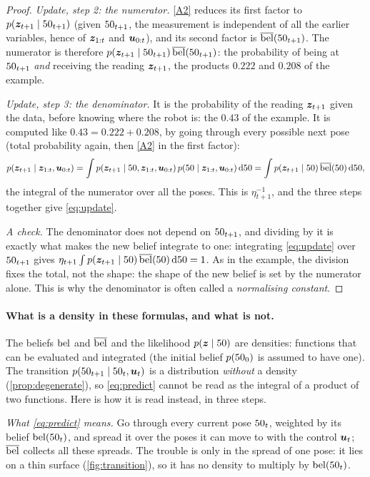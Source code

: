 \begin{proof}
\emph{Update, step 2: the numerator.} \ref{A2} reduces its first factor
to $p(\bm{z}_{t+1}\mid50_{t+1})$ (given $50_{t+1}$, the measurement is
independent of all the earlier variables, hence of $\bm{z}_{1:t}$ and
$\bm{u}_{0:t}$), and its second factor is $\overline{\operatorname{bel}}(50_{t+1})$. The numerator
is therefore $p(\bm{z}_{t+1}\mid50_{t+1})\,\overline{\operatorname{bel}}(50_{t+1})$: the probability
of being at $50_{t+1}$ \emph{and} receiving the reading $\bm{z}_{t+1}$, the
products $0.222$ and $0.208$ of the example.

\emph{Update, step 3: the denominator.} It is the probability of the
reading $\bm{z}_{t+1}$ given the data, before knowing where the robot is: the
$0.43$ of the example. It is computed like $0.43=0.222+0.208$, by going
through every possible next pose (total probability again, then \ref{A2}
in the first factor):
\[
  p(\bm{z}_{t+1}\mid\bm{z}_{1:t},\bm{u}_{0:t})
  =\int p(\bm{z}_{t+1}\mid50,\bm{z}_{1:t},\bm{u}_{0:t})\,
   p(50\mid\bm{z}_{1:t},\bm{u}_{0:t})\,\mathrm d50
  =\int p(\bm{z}_{t+1}\mid50)\,\overline{\operatorname{bel}}(50)\,\mathrm d50 ,
\]
the integral of the numerator over all the poses. This is
$\eta_{t+1}^{-1}$, and the three steps together give \eqref{eq:update}.

\emph{A check.} The denominator does not depend on $50_{t+1}$, and
dividing by it is exactly what makes the new belief integrate to one:
integrating \eqref{eq:update} over $50_{t+1}$ gives
$\eta_{t+1}\int p(\bm{z}_{t+1}\mid50)\,\overline{\operatorname{bel}}(50)\,\mathrm d50=1$. As in the
example, the division fixes the total, not the shape: the shape of the
new belief is set by the numerator alone. This is why the denominator is
often called a \emph{normalising constant}.
\end{proof}

\paragraph{What is a density in these formulas, and what is not.} The
beliefs $\operatorname{bel}$ and $\overline{\operatorname{bel}}$ and the likelihood $p(\bm{z}\mid50)$ are
densities: functions that can be evaluated and integrated (the initial
belief $p(50_0)$ is assumed to have one). The transition
$p(50_{t+1}\mid50_t,\bm{u}_t)$ is a distribution \emph{without} a density
(\cref{prop:degenerate}), so \eqref{eq:predict} cannot be read as the
integral of a product of two functions. Here is how it is read instead, in
three steps.

\emph{What \eqref{eq:predict} means.} Go through every current pose
$50_t$, weighted by its belief $\operatorname{bel}(50_t)$, and spread it over the poses
it can move to with the control $\bm{u}_t$; $\overline{\operatorname{bel}}$ collects all these
spreads. The trouble is only in the spread of one pose: it lies on a thin
surface (\cref{fig:transition}), so it has no density to multiply by
$\operatorname{bel}(50_t)$.

